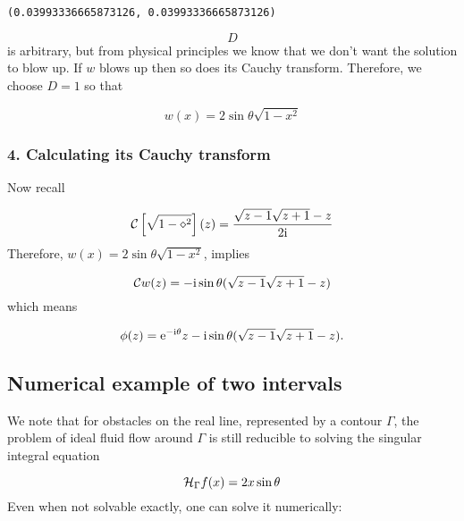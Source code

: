 \documentclass[12pt,a4paper]{article}
\def\I{ {\rm i} }
\def\E{ {\rm e} }
\def\CC{ {\cal C} }
\def\HH{ {\cal H} }
\begin{document}
\begin{lstlisting}
(0.03993336665873126, 0.03993336665873126)
\end{lstlisting}


\[
D
\]
is arbitrary, but from physical principles we know that we don't want the solution to blow up. If $w$ blows up then so does its Cauchy transform. Therefore, we choose $D = 1$ so that

\[
w(x) = 2 \sin \theta \sqrt{1-x^2}
\]
\subsubsection{4. Calculating its Cauchy transform}
Now recall

\[
\CC\left[{\sqrt{1-\diamond^2}}\right](z) = {\sqrt{z-1} \sqrt{z+1} -z \over 2 \I}
\]
Therefore, $w(x) = 2 \sin \theta \sqrt{1-x^2}$,  implies

\[
\CC w(z) = - \I \sin \theta (\sqrt{z-1} \sqrt{z+1} -z)
\]
which means

\[
\phi(z) = \E^{-\I \theta} z - \I \sin \theta (\sqrt{z-1} \sqrt{z+1} -z).
\]
\subsection{Numerical example of two intervals}
We note that for obstacles on the real line, represented by a contour $\Gamma$, the problem of ideal fluid flow around $\Gamma$ is still reducible to solving the singular integral equation

\[
\HH_\Gamma f(x) = 2 x  \sin \theta
\]
Even when not solvable exactly, one can solve it numerically:
\end{document}
